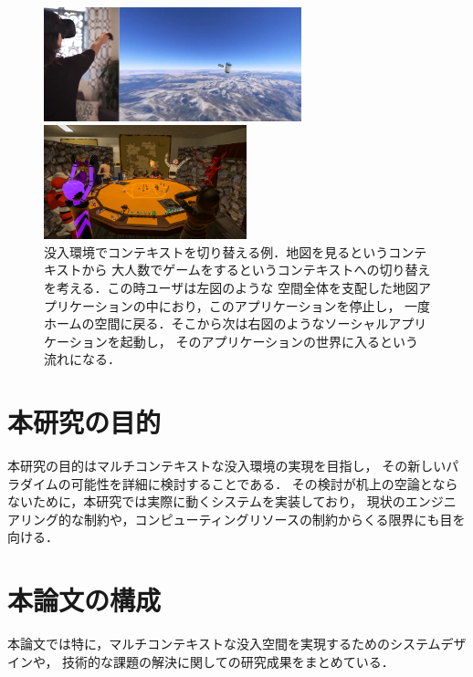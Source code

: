 \begin{figure}[htbp]
  \begin{minipage}[t]{0.55\linewidth}
    \captionsetup[sub]{margin=0.1cm}
    \centering
    \includegraphics[keepaspectratio, height=1.3in]{figures/google-earth.png}
  \end{minipage}
  \begin{minipage}[t]{0.43\linewidth}
    \captionsetup[sub]{margin=0.1cm}
    \centering
    \includegraphics[keepaspectratio, height=1.3in]{figures/vrc.png}
  \end{minipage}
  \caption{
    没入環境でコンテキストを切り替える例．地図を見るというコンテキストから
    大人数でゲームをするというコンテキストへの切り替えを考える．この時ユーザは左図のような
    空間全体を支配した地図アプリケーションの中におり，このアプリケーションを停止し，
    一度ホームの空間に戻る．そこから次は右図のようなソーシャルアプリケーションを起動し，
    そのアプリケーションの世界に入るという流れになる．
  }
  \label{fig:switching-app}
\end{figure}


\section{本研究の目的}

本研究の目的はマルチコンテキストな没入環境の実現を目指し，
その新しいパラダイムの可能性を詳細に検討することである．
その検討が机上の空論とならないために，本研究では実際に動くシステムを実装しており，
現状のエンジニアリング的な制約や，コンピューティングリソースの制約からくる限界にも目を向ける．


\section{本論文の構成}

本論文では特に，マルチコンテキストな没入空間を実現するためのシステムデザインや，
技術的な課題の解決に関しての研究成果をまとめている．

